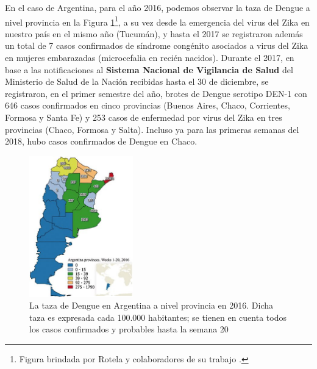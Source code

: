   \par En el caso de Argentina, para el año 2016, podemos observar la taza de
  Dengue a nivel
  provincia \cite{analisis_cordoba} en la
  Figura \ref{fig:dengue}\footnote{Figura brindada por Rotela y
  colaboradores de su trabajo \cite{analisis_cordoba}.}, a su vez desde la
  emergencia del virus del Zika en nuestro país en el mismo año (Tucumán),
  y hasta el 2017 se registraron además un total de 7 casos confirmados de
  síndrome congénito asociados a virus del Zika en mujeres embarazadas
  (microcefalia en recién nacidos).
  Durante el 2017, en base a las notificaciones al
  \textbf{Sistema Nacional de Vigilancia de Salud} del Ministerio de Salud de la Nación
  recibidas hasta el 30 de diciembre, se registraron, en el primer semestre del año, brotes de
  Dengue serotipo DEN-1 con 646 casos confirmados en cinco provincias
  (Buenos Aires, Chaco, Corrientes, Formosa y Santa Fe) y 253 casos de enfermedad
  por virus del Zika en tres provincias (Chaco, Formosa y Salta).
  Incluso ya para las primeras semanas del 2018, hubo casos confirmados
  de Dengue en Chaco.

  \begin{figure}
  \centering%
  \includegraphics[width=0.4\textwidth]{images/dengue}%
  \caption{La taza de Dengue en Argentina a nivel provincia en 2016.
          Dicha taza es expresada cada 100.000 habitantes; se tienen en cuenta
          todos los casos confirmados y probables hasta la semana 20}\label{fig:dengue}
  \end{figure}


